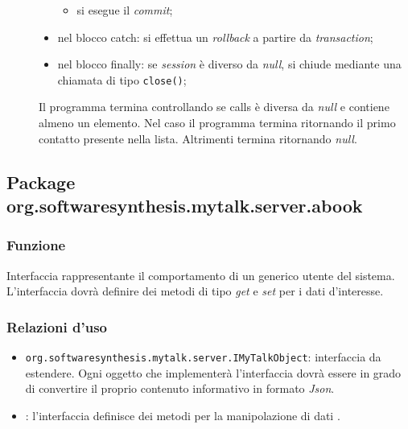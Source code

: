 \begin{description}
\begin{itemize}
\begin{itemize}
			\item si esegue il \textit{commit};
		\end{itemize}
		\item nel blocco catch: si effettua un \textit{rollback} a partire da \textit{transaction};
		\item nel blocco finally: se \textit{session} è diverso da \textit{null}, si chiude mediante una chiamata di tipo \texttt{close()};
	\end{itemize}
	Il programma termina controllando se calls è diversa da \textit{null} e contiene almeno un elemento. Nel caso il programma termina ritornando il primo contatto presente nella lista. Altrimenti termina ritornando \textit{null}.
	
\end{description}

\subsection{Package org.softwaresynthesis.mytalk.server.abook}\label{sec:abook}


\subsubsection*{Funzione}
Interfaccia rappresentante il comportamento di un generico utente del sistema. L'interfaccia dovrà definire dei metodi di tipo \textit{get} e \textit{set} per i dati d'interesse.

\subsubsection*{Relazioni d'uso}

\begin{itemize}
	\item \texttt{org.softwaresynthesis.mytalk.server.IMyTalkObject}: interfaccia da estendere. Ogni oggetto che implementerà l'interfaccia  dovrà essere in grado di convertire il proprio contenuto informativo in formato \textit{Json}.
	\item {}: l'interfaccia definisce dei metodi per la manipolazione di dati .
\end{itemize}

